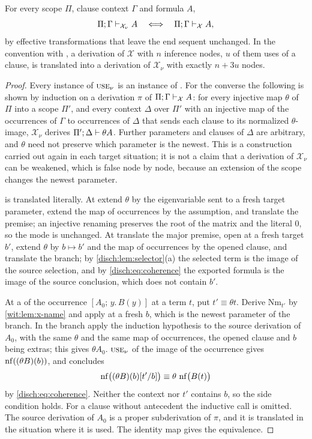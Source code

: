 \begin{theorem}
\label{wit:thm:x-newest}
For every scope $\Pi$, clause context $\Gamma$ and formula $A$,
\[
 \Pi;\Gamma\vdash_{\mathcal X_\nu}A
 \quad\Longleftrightarrow\quad
 \Pi;\Gamma\vdash_{\mathcal X}A ,
\]
by effective transformations that leave the end sequent unchanged.  In the
convention with , a derivation of $\mathcal X$ with $n$
inference nodes, $u$ of them uses of a clause, is translated into a
derivation of $\mathcal X_\nu$ with exactly $n+3u$ nodes.
\end{theorem}

\begin{proof}
Every instance of $\rulename{Use}_\nu$ is an instance of .
For the converse the following is shown by induction on a derivation $\pi$
of $\Pi;\Gamma\vdash_{\mathcal X}A$: for every injective map $\theta$ of
$\Pi$ into a scope $\Pi'$, and every context $\Delta$ over $\Pi'$ with an
injective map of the occurrences of $\Gamma$ to occurrences of $\Delta$ that
sends each clause to its normalized $\theta$-image, $\mathcal X_\nu$ derives
$\Pi';\Delta\vdash\theta A$.  Further parameters and clauses of $\Delta$
are arbitrary, and $\theta$ need not preserve which parameter is the newest.
This is a construction carried out again in each target situation; it is not
a claim that a derivation of $\mathcal X_\nu$ can be weakened, which is false
node by node, because an extension of the scope changes the newest
parameter.

 is translated literally.  At  extend
$\theta$ by the eigenvariable sent to a fresh target parameter, extend the
map of occurrences by the assumption, and translate the premise; an
injective renaming preserves the root of the matrix and the literal $0$, so
the mode is unchanged.  At  translate the major premise,
open at a fresh target $b'$, extend $\theta$ by $b\mapsto b'$ and the map of
occurrences by the opened clause, and translate the branch; by
\cref{disch:lem:selector}(a) the selected term is the image of the source
selection, and by \eqref{disch:eq:coherence} the exported formula is the
image of the source conclusion, which does not contain $b'$.

At a  of the occurrence $[A_0;\,y.\,B(y)]$ at a term $t$, put
$t'\equiv\theta t$.  Derive $\mathrm{Nm}_{t'}$ by \cref{wit:lem:x-name} and
apply  at a fresh $b$, which is the newest parameter of the
branch.  In the branch apply the induction hypothesis to the source
derivation of $A_0$, with the same $\theta$ and the same map of occurrences,
the opened clause and $b$ being extras; this gives $\theta A_0$.
$\rulename{Use}_\nu$ of the image of the occurrence gives
$\operatorname{nf}((\theta B)(b))$, and  concludes
\[
 \operatorname{nf}\bigl((\theta B)(b)[t'/b]\bigr)\equiv\theta\,\operatorname{nf}\bigl(B(t)\bigr)
\]
by \eqref{disch:eq:coherence}.  Neither the context nor $t'$ contains $b$,
so the side condition holds.  For a clause without antecedent the inductive
call is omitted.  The source derivation of $A_0$ is a proper subderivation
of $\pi$, and it is translated in the situation where it is used.  The
identity map gives the equivalence.


\end{proof}
